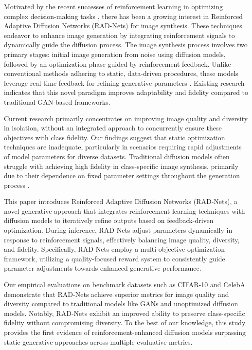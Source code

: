 \documentclass{article} %
\begin{document}
Motivated by the recent successes of reinforcement learning in optimizing complex decision-making tasks \citep{lillicrap2015continuous}, there has been a growing interest in Reinforced Adaptive Diffusion Networks (RAD-Nets) for image synthesis. These techniques endeavor to enhance image generation by integrating reinforcement signals to dynamically guide the diffusion process. The image synthesis process involves two primary stages: initial image generation from noise using diffusion models, followed by an optimization phase guided by reinforcement feedback. Unlike conventional methods adhering to static, data-driven procedures, these models leverage real-time feedback for refining generative parameters \citep{ho2020denoising}. Existing research indicates that this novel paradigm improves adaptability and fidelity compared to traditional GAN-based frameworks.

Current research primarily concentrates on improving image quality and diversity in isolation, without an integrated approach to concurrently ensure these objectives with class fidelity. Our findings suggest that static optimization techniques are inadequate, particularly in scenarios requiring rapid adjustments of model parameters for diverse datasets. Traditional diffusion models often struggle with achieving high fidelity in class-specific image synthesis, primarily due to their dependence on fixed parameter settings throughout the generation process \citep{song2020score}.

This paper introduces Reinforced Adaptive Diffusion Networks (RAD-Nets), a novel generative approach that integrates reinforcement learning techniques with diffusion models to iteratively refine outputs based on feedback-driven optimization. During inference, RAD-Nets adjust parameters dynamically in response to reinforcement signals, effectively balancing image quality, diversity, and fidelity. Specifically, RAD-Nets employ a multi-objective optimization framework, utilizing a quality-focused reward system to consistently guide parameter adjustments towards enhanced generative performance.

Our empirical evaluations on benchmark datasets such as CIFAR-10 and CelebA demonstrate that RAD-Nets achieve superior metrics for image quality and diversity compared to traditional models like GANs and unoptimized diffusion models. Notably, RAD-Nets exhibit an improved ability to preserve class-specific fidelity without compromising diversity. To the best of our knowledge, this study provides the first evidence of reinforcement-enhanced diffusion models surpassing static generative approaches across multiple evaluative metrics.
\end{document}

